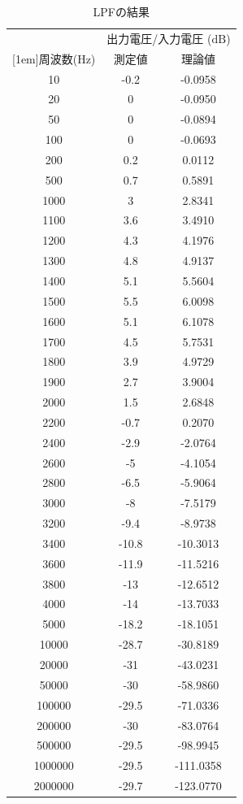 \documentclass[11pt,a4j]{jsarticle}
\begin{document}
\begin{table}[H]
  \caption{LPFの結果}
  \label{tab:lpf}
  \begin{center}
      \begin{tabular}{|c|c|c|}
        \hline
        & \multicolumn{2}{c|}{出力電圧/入力電圧 ($\mathrm{dB}$)} \\ \cline{2-3}
        \raisebox{0.8em}[1em]{周波数($\mathrm{Hz}$)} & 測定値 & 理論値 \\ \hline
        10	&	-0.2	&	-0.0958	\\
        20	&	0	&	-0.0950	\\
        50	&	0	&	-0.0894	\\
        100	&	0	&	-0.0693	\\
        200	&	0.2	&	0.0112	\\
        500	&	0.7	&	0.5891	\\
        1000	&	3	&	2.8341	\\
        1100	&	3.6	&	3.4910	\\
        1200	&	4.3	&	4.1976	\\
        1300	&	4.8	&	4.9137	\\
        1400	&	5.1	&	5.5604	\\
        1500	&	5.5	&	6.0098	\\
        1600	&	5.1	&	6.1078	\\
        1700	&	4.5	&	5.7531	\\
        1800	&	3.9	&	4.9729	\\
        1900	&	2.7	&	3.9004	\\
        2000	&	1.5	&	2.6848	\\
        2200	&	-0.7	&	0.2070	\\
        2400	&	-2.9	&	-2.0764	\\
        2600	&	-5	&	-4.1054	\\
        2800	&	-6.5	&	-5.9064	\\
        3000	&	-8	&	-7.5179	\\
        3200	&	-9.4	&	-8.9738	\\
        3400	&	-10.8	&	-10.3013	\\
        3600	&	-11.9	&	-11.5216	\\
        3800	&	-13	&	-12.6512	\\
        4000	&	-14	&	-13.7033	\\
        5000	&	-18.2	&	-18.1051	\\
        10000	&	-28.7	&	-30.8189	\\
        20000	&	-31	&	-43.0231	\\
        50000	&	-30	&	-58.9860	\\
        100000	&	-29.5	&	-71.0336	\\
        200000	&	-30	&	-83.0764	\\
        500000	&	-29.5	&	-98.9945	\\
        1000000	&	-29.5	&	-111.0358	\\
        2000000	&	-29.7	&	-123.0770	\\ \hline
      \end{tabular}
  \end{center}
\end{table}
\end{document}
